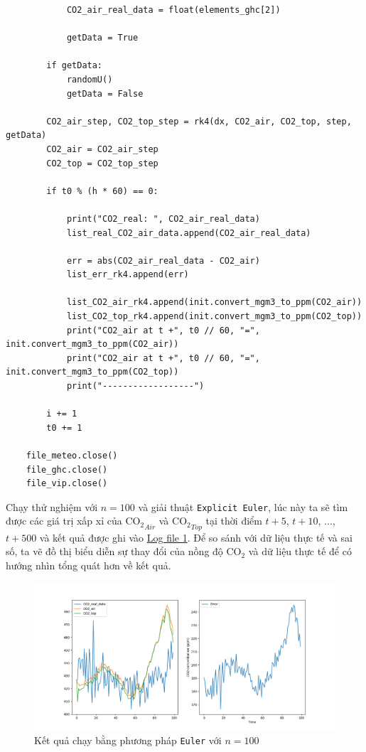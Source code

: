 \documentclass[a4paper]{article}
\begin{document}
\begin{verbatim}
            CO2_air_real_data = float(elements_ghc[2])

            getData = True

        if getData:
            randomU()
            getData = False

        CO2_air_step, CO2_top_step = rk4(dx, CO2_air, CO2_top, step, getData)
        CO2_air = CO2_air_step
        CO2_top = CO2_top_step

        if t0 % (h * 60) == 0:

            print("CO2_real: ", CO2_air_real_data)
            list_real_CO2_air_data.append(CO2_air_real_data)

            err = abs(CO2_air_real_data - CO2_air)
            list_err_rk4.append(err)
            
            list_CO2_air_rk4.append(init.convert_mgm3_to_ppm(CO2_air))
            list_CO2_top_rk4.append(init.convert_mgm3_to_ppm(CO2_top))
            print("CO2_air at t +", t0 // 60, "=", init.convert_mgm3_to_ppm(CO2_air))
            print("CO2_air at t +", t0 // 60, "=", init.convert_mgm3_to_ppm(CO2_top))
            print("------------------")

        i += 1
        t0 += 1

    file_meteo.close()
    file_ghc.close()
    file_vip.close()
\end{verbatim}

Chạy thử nghiệm với $n=100$ và giải thuật \texttt{Explicit Euler}, lúc này ta sẽ tìm được các giá trị xấp xỉ của $\mathrm{CO_{2}}_{Air}$ và $\mathrm{CO_{2}}_{Top}$ tại thời điểm $t+5$, $t+10$, $...$, $t+500$ và kết quả được ghi vào \href{https://files.catbox.moe/zd28ln.txt}{Log file 1}. Để so sánh với dữ liệu thực tế và sai số, ta vẽ đồ thị biểu diễn sự thay đổi của nồng độ $\mathrm{CO_{2}}$ và dữ liệu thực tế để có hướng nhìn tổng quát hơn về kết quả. 
\begin{figure}[!h]
    \centering
    \includegraphics[width=16cm]{Euler.png}
    \caption{Kết quả chạy bằng phương pháp \texttt{Euler} với $n=100$}
    \label{fig:eul}
\end{figure}
\end{document}
